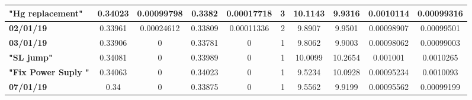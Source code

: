 {\begin{tabular}{lccccccccc}
\textbf{"Hg replacement"}&0.34023&0.00099798&0.3382&0.00017718&3&10.1143&9.9316&0.0010114&0.00099316\\\midrule
\textbf{02/01/19}&0.33961&0.00024612&0.33809&0.00011336&2&9.8907&9.9501&0.00098907&0.00099501\\\midrule
\textbf{03/01/19}&0.33906&0&0.33781&0&1&9.8062&9.9003&0.00098062&0.00099003\\\midrule
\textbf{"SL jump"}&0.34081&0&0.33989&0&1&10.0099&10.2654&0.001001&0.0010265\\\midrule
\textbf{"Fix Power Suply "}&0.34063&0&0.34023&0&1&9.5234&10.0928&0.00095234&0.0010093\\\midrule
\textbf{07/01/19}&0.34&0&0.33875&0&1&9.5562&9.9199&0.00095562&0.00099199\\
\bottomrule
\end{tabular}
}